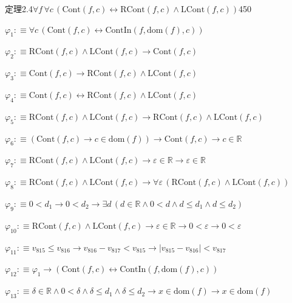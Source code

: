 \begin{fullproof}{定理2.4}{$\forall f\,\forall c\,(\mathrm{Cont}(f,c) \leftrightarrow \mathrm{RCont}(f,c) \land \mathrm{LCont}(f,c))$}{450}
\begin{ptree}
\noLine
{}
\noLine
{}
\end{ptree}
\begin{abbrevlist}
\item $\varphi_{1} :\equiv \forall c\,(\mathrm{Cont}(f,c) \leftrightarrow \mathrm{ContIn}(f,\mathrm{dom}(f),c))$
\item $\varphi_{2} :\equiv \mathrm{RCont}(f,c) \land \mathrm{LCont}(f,c) \to \mathrm{Cont}(f,c)$
\item $\varphi_{3} :\equiv \mathrm{Cont}(f,c) \to \mathrm{RCont}(f,c) \land \mathrm{LCont}(f,c)$
\item $\varphi_{4} :\equiv \mathrm{Cont}(f,c) \leftrightarrow \mathrm{RCont}(f,c) \land \mathrm{LCont}(f,c)$
\item $\varphi_{5} :\equiv \mathrm{RCont}(f,c) \land \mathrm{LCont}(f,c) \to \mathrm{RCont}(f,c) \land \mathrm{LCont}(f,c)$
\item $\varphi_{6} :\equiv (\mathrm{Cont}(f,c) \to c \in \mathrm{dom}(f)) \to \mathrm{Cont}(f,c) \to c \in \mathbb{R}$
\item $\varphi_{7} :\equiv \mathrm{RCont}(f,c) \land \mathrm{LCont}(f,c) \to \varepsilon \in \mathbb{R} \to \varepsilon \in \mathbb{R}$
\item $\varphi_{8} :\equiv \mathrm{RCont}(f,c) \land \mathrm{LCont}(f,c) \to \forall \varepsilon\,(\mathrm{RCont}(f,c) \land \mathrm{LCont}(f,c))$
\item $\varphi_{9} :\equiv 0 < d_{1} \to 0 < d_{2} \to \exists d\,(d \in \mathbb{R} \land 0 < d \land d \leq d_{1} \land d \leq d_{2})$
\item $\varphi_{10} :\equiv \mathrm{RCont}(f,c) \land \mathrm{LCont}(f,c) \to \varepsilon \in \mathbb{R} \to 0 < \varepsilon \to 0 < \varepsilon$
\item $\varphi_{11} :\equiv v_{815} \leq v_{816} \to v_{816} - v_{817} < v_{815} \to \lvert v_{815} - v_{816} \rvert < v_{817}$
\item $\varphi_{12} :\equiv \varphi_{1} \to (\mathrm{Cont}(f,c) \leftrightarrow \mathrm{ContIn}(f,\mathrm{dom}(f),c))$
\item $\varphi_{13} :\equiv \delta \in \mathbb{R} \land 0 < \delta \land \delta \leq d_{1} \land \delta \leq d_{2} \to x \in \mathrm{dom}(f) \to x \in \mathrm{dom}(f)$

\end{abbrevlist}
\end{fullproof}
